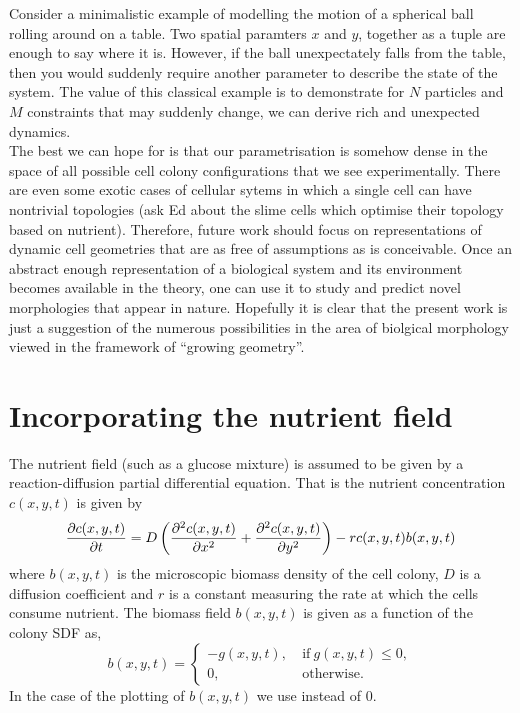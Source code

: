 Consider a minimalistic example of modelling the motion of a spherical ball rolling around on a table.
Two spatial paramters $x$ and $y$, together as a tuple are enough to say where it is. However, 
if the ball unexpectately falls from the table, then you would suddenly require
another parameter to describe the state of the system. The value of this classical example
is to demonstrate for $N$ particles and $M$ constraints that may suddenly change, 
we can derive rich and unexpected dynamics.
\\

The best we can hope for is that our parametrisation is somehow dense in the space
of all possible cell colony configurations that we see experimentally. There are even
some exotic cases of cellular sytems in which a single cell can have nontrivial topologies (ask Ed 
about the slime cells which optimise their topology based on nutrient). Therefore, future work 
should focus on representations of dynamic cell geometries that are as free of assumptions as
is conceivable. Once an abstract enough representation of a biological system and its environment
becomes available in the theory, one can use it to study and predict novel morphologies that appear 
in nature. Hopefully it is clear that the present work is just a suggestion of the numerous possibilities
in the area of biolgical morphology viewed in the framework of ``growing geometry''.


\section{Incorporating the nutrient field}
The nutrient field (such as a glucose mixture) is assumed to be given by a reaction-diffusion 
partial differential equation. That is the nutrient concentration $c(x,y,t)$ is given by
\begin{equation*}
    \pdv{c(x,y,t)}{t} = D \left( \frac{\partial^2 c(x,y,t)}{\partial x^2} + 
                          \frac{\partial^2 c(x,y,t)}{\partial y^2} \right) - r c(x,y,t) b(x,y,t)
\end{equation*}
where $b(x,y,t)$ is the microscopic biomass density of the cell colony, $D$ is a diffusion
coefficient and $r$ is a constant measuring the rate at which the cells consume nutrient.
The biomass field $b(x,y,t)$ is given as a function of the colony SDF as,
\begin{equation*}
    b(x,y,t) = \begin{cases}
                -g(x,y,t), & \ \textrm{if} \ g(x,y,t) \leq 0, \\
                0,         & \ \textrm{otherwise}.
               \end{cases}
\end{equation*}
In the case of the plotting of $b(x,y,t)$ we use  instead of $0$. 
\\

